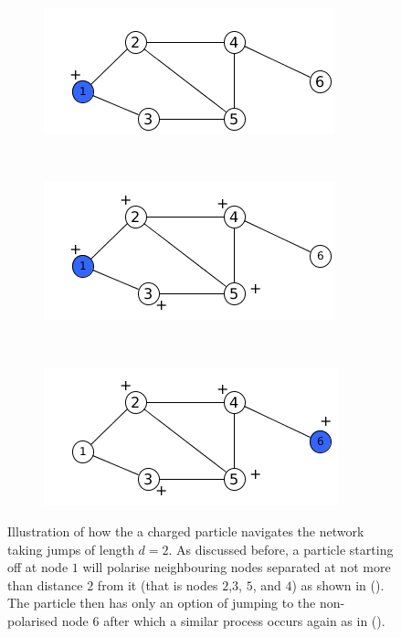 \documentclass[10pt,a4paper]{article}
\begin{document}
    	    \begin{figure}[H]
    	    	\centering
    	    	\begin{subfigure}[b]{0.3\textwidth}
    	    		\includegraphics[width=\textwidth]{images/nodecharge1.png}
    	    		\caption{}
    	    		\label{polarityl21}
    	    	\end{subfigure}~
    	    	\begin{subfigure}[b]{0.3\textwidth}
    	    		\includegraphics[width=\textwidth]{images/nodecharge41.png}
    	    		\caption{}
    	    		\label{polarityl22}
    	    	\end{subfigure}~ 
    	    	\begin{subfigure}[b]{0.3\textwidth}
    	    		\includegraphics[width=\textwidth]{images/nodecharge4.png}
    	    		\caption{}
    	    		\label{polarityl23}
    	    	\end{subfigure}
    	    	\caption{Illustration of how the a charged particle navigates the network taking jumps of length $d=2$. As discussed before, a particle starting off at node $1$ will polarise neighbouring nodes separated at not more than distance $2$ from it (that is nodes $2$,$3$, $5$, and $4$) as shown in (). The particle then has only an option of jumping to the non-polarised node $6$ after which a similar process occurs again as in (). } \label{2-path-particle}
    	    \end{figure}
    	    
\end{document}
